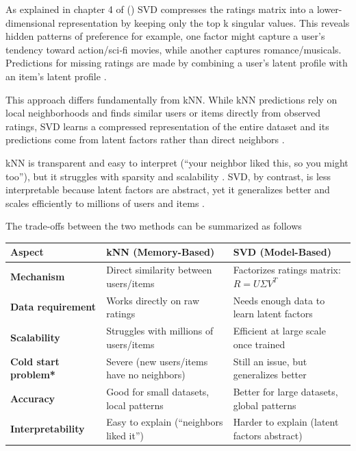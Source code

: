 \documentclass[
  12pt]{article}
\begin{document}
As explained in chapter 4 of (\citet{apxml2025}) SVD compresses the
ratings matrix into a lower-dimensional representation by keeping only
the top k singular values. This reveals hidden patterns of preference
for example, one factor might capture a user's tendency toward
action/sci‑fi movies, while another captures romance/musicals.
Predictions for missing ratings are made by combining a user's latent
profile with an item's latent profile \citep{apxml2025}.

This approach differs fundamentally from kNN. While kNN predictions rely
on local neighborhoods and finds similar users or items directly from
observed ratings, SVD learns a compressed representation of the entire
dataset and its predictions come from latent factors rather than direct
neighbors \citep{hssina2021}.

kNN is transparent and easy to interpret (``your neighbor liked this, so
you might too''), but it struggles with sparsity and scalability
\citep{nikolakopoulos2021}. SVD, by contrast, is less interpretable
because latent factors are abstract, yet it generalizes better and
scales efficiently to millions of users and items \citep{apxml2025}.

The trade-offs between the two methods can be summarized as
follows\citep{apxml2025, nikolakopoulos2021, hssina2021}

\begin{longtable}[]{@{}
  >{\raggedright\arraybackslash}p{}
  >{\raggedright\arraybackslash}p{}
  >{\raggedright\arraybackslash}p{}@{}}
\toprule\noalign{}
\begin{minipage}[b]{\linewidth}\raggedright
Aspect
\end{minipage} & \begin{minipage}[b]{\linewidth}\raggedright
kNN (Memory-Based)
\end{minipage} & \begin{minipage}[b]{\linewidth}\raggedright
SVD (Model-Based)
\end{minipage} \\
\midrule\noalign{}
\endhead
\bottomrule\noalign{}
\endlastfoot
\textbf{Mechanism} & Direct similarity between users/items & Factorizes
ratings matrix: \(R = U \Sigma V^T\) \\
\textbf{Data requirement} & Works directly on raw ratings & Needs enough
data to learn latent factors \\
\textbf{Scalability} & Struggles with millions of users/items &
Efficient at large scale once trained \\
\textbf{Cold start problem*} & Severe (new users/items have no
neighbors) & Still an issue, but generalizes better \\
\textbf{Accuracy} & Good for small datasets, local patterns & Better for
large datasets, global patterns \\
\textbf{Interpretability} & Easy to explain (``neighbors liked it'') &
Harder to explain (latent factors abstract) \\
\end{longtable}
\end{document}

